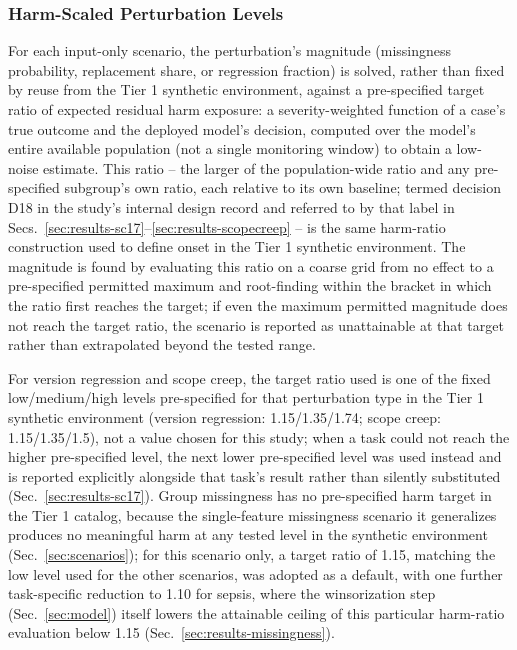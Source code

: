 \documentclass[preprintsapa,article,submit,oneauthor]{Definitions/mdpi}
\begin{document}
\subsubsection{Harm-Scaled Perturbation Levels}\label{sec:levelsolving}

For each input-only scenario, the perturbation's magnitude (missingness probability, replacement share, or regression fraction) is solved, rather than fixed by reuse from the Tier 1 synthetic environment, against a pre-specified target ratio of expected residual harm exposure: a severity-weighted function of a case's true outcome and the deployed model's decision, computed over the model's entire available population (not a single monitoring window) to obtain a low-noise estimate. This ratio -- the larger of the population-wide ratio and any pre-specified subgroup's own ratio, each relative to its own baseline; termed decision D18 in the study's internal design record and referred to by that label in Secs.~\ref{sec:results-sc17}--\ref{sec:results-scopecreep} -- is the same harm-ratio construction used to define onset in the Tier 1 synthetic environment. The magnitude is found by evaluating this ratio on a coarse grid from no effect to a pre-specified permitted maximum and root-finding within the bracket in which the ratio first reaches the target; if even the maximum permitted magnitude does not reach the target ratio, the scenario is reported as unattainable at that target rather than extrapolated beyond the tested range.

For version regression and scope creep, the target ratio used is one of the fixed low/medium/high levels pre-specified for that perturbation type in the Tier 1 synthetic environment (version regression: 1.15/1.35/1.74; scope creep: 1.15/1.35/1.5), not a value chosen for this study; when a task could not reach the higher pre-specified level, the next lower pre-specified level was used instead and is reported explicitly alongside that task's result rather than silently substituted (Sec.~\ref{sec:results-sc17}). Group missingness has no pre-specified harm target in the Tier 1 catalog, because the single-feature missingness scenario it generalizes produces no meaningful harm at any tested level in the synthetic environment (Sec.~\ref{sec:scenarios}); for this scenario only, a target ratio of 1.15, matching the low level used for the other scenarios, was adopted as a default, with one further task-specific reduction to 1.10 for sepsis, where the winsorization step (Sec.~\ref{sec:model}) itself lowers the attainable ceiling of this particular harm-ratio evaluation below 1.15 (Sec.~\ref{sec:results-missingness}).
\end{document}
